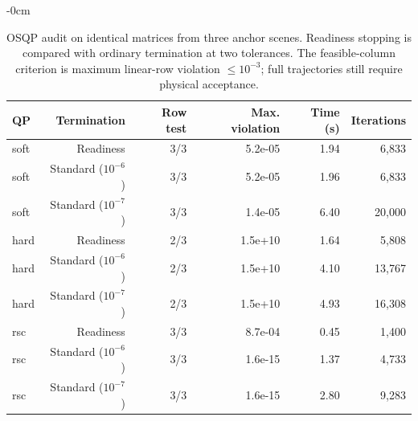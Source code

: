 \begin{table}[htbp]
\begin{adjustwidth}{-\extralength}{0cm}
\caption{OSQP audit on identical matrices from three anchor scenes. Readiness stopping is compared with ordinary termination at two tolerances. The feasible-column criterion is maximum linear-row violation $\leq10^{-3}$; full trajectories still require physical acceptance.\label{tab:solver-new}}
\centering\small
\begin{tabular}{lrrrrr}\toprule
QP & Termination & Row test & Max. violation & Time (s) & Iterations\\\midrule
soft & Readiness & 3/3 & 5.2e-05 & 1.94 & 6,833\\
soft & Standard ($10^{-6}$) & 3/3 & 5.2e-05 & 1.96 & 6,833\\
soft & Standard ($10^{-7}$) & 3/3 & 1.4e-05 & 6.40 & 20,000\\
hard & Readiness & 2/3 & 1.5e+10 & 1.64 & 5,808\\
hard & Standard ($10^{-6}$) & 2/3 & 1.5e+10 & 4.10 & 13,767\\
hard & Standard ($10^{-7}$) & 2/3 & 1.5e+10 & 4.93 & 16,308\\
rsc & Readiness & 3/3 & 8.7e-04 & 0.45 & 1,400\\
rsc & Standard ($10^{-6}$) & 3/3 & 1.6e-15 & 1.37 & 4,733\\
rsc & Standard ($10^{-7}$) & 3/3 & 1.6e-15 & 2.80 & 9,283\\
\bottomrule\end{tabular}
\end{adjustwidth}
\end{table}
